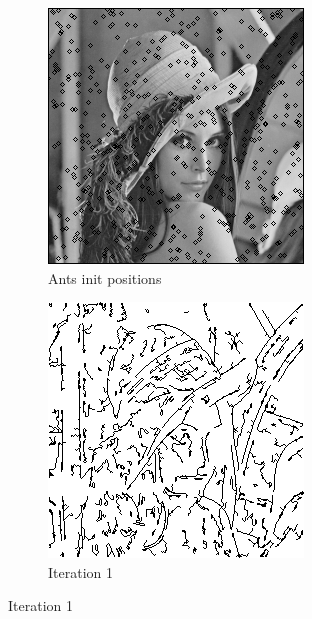 \documentclass{llncs}
\begin{document}
	\begin{figure}
        \centering
        \begin{subfigure}[b]{0.3\textwidth}
                \includegraphics[width=\textwidth]{IMG/RandomInit/Initialization}
                \caption{Ants init positions}
                \label{fig:rand_init}
        \end{subfigure}%
        \qquad
        \begin{subfigure}[b]{0.3\textwidth}
                \includegraphics[width=\textwidth]{IMG/RandomInit/Iteration1}
                \caption{Iteration 1}
                \label{fig:rand_iter1}
        \end{subfigure}
        

\end{figure}
\end{document}
